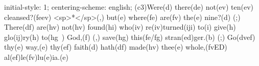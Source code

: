 initial-style: 1;
centering-scheme: english;
(c3)Were(d) there(de) not(ev) ten(ev) cleansed?(feev) <sp>*</sp>(,) but(e) where(fe) are(fv) the(e) nine?(d) (;) There(df) are(hv) not(hv) found(hi) who(iv) re(iv)turned(iji) to(i) give(h) glo(ij)ry(h) to(hg~) God,(f) (,) save(hg) this(fe/fg) stran(ed)ger.(b) (;) Go(dvef) thy(e) way,(e) thy(ef) faith(d) hath(df) made(hv) thee(e) whole,(fvED) al(ef)le(fv)lu(e)ia.(e)
